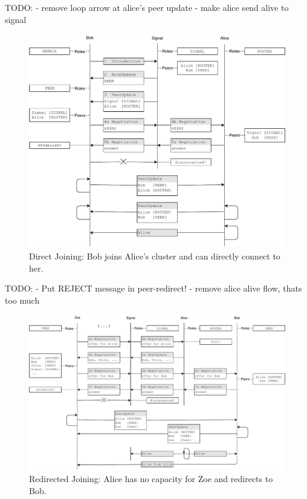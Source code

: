 TODO:
- remove loop arrow at alice's peer update
- make alice send alive to signal
\begin{figure}
\centering
\includegraphics[width=1\textwidth]{graphics/design/peer-join.pdf}
\caption{Direct Joining: Bob joins Alice's cluster and can directly connect to her.}
\label{fig:peer-join}
\end{figure}


TODO:
- Put REJECT message in peer-redirect!
- remove alice alive flow, thats too much
\begin{figure}
\centering
\includegraphics[width=1\textwidth]{graphics/design/join-redirect.pdf}
\caption{Redirected Joining: Alice has no capacity for Zoe and redirects to Bob.}
\label{fig:peer-redirect}
\end{figure}
